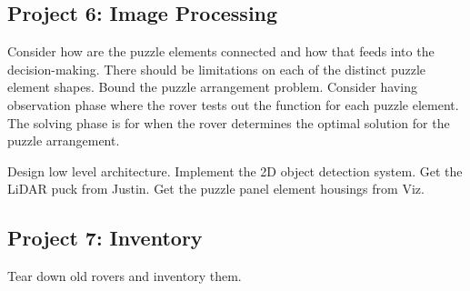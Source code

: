 \documentclass[a4paper, 10pt]{article}
\begin{document}
	\subsection*{Project 6: Image Processing}
	Consider how are the puzzle elements connected and how that feeds into the decision-making. There should be limitations on each of the distinct puzzle element shapes. Bound the puzzle arrangement problem. Consider having observation phase where the rover tests out the function for each puzzle element. The solving phase is for when the rover determines the optimal solution for the puzzle arrangement. 
	
	Design low level architecture. Implement the 2D object detection system. Get the LiDAR puck from Justin. Get the puzzle panel element housings from Viz.
		
	\subsection*{Project 7: Inventory}
	Tear down old rovers and inventory them.	
\end{document}
